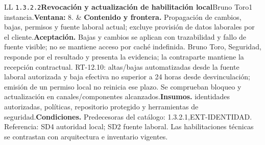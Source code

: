 \begin{longtable}{L{\tabcolsep\relax}L{\tabcolsep\relax}}
\texttt{1.\allowbreak{}3.\allowbreak{}2.\allowbreak{}2}\newline{}\textbf{Revocación y actualización de habilitación local}\newline{}Bruno Toro\newline{}1 instancia.\newline{}\textbf{Ventana:} 8. & \textbf{Contenido y frontera.} Propagación de cambios, bajas, permisos y fuente laboral actual; excluye provisión de datos laborales por el cliente.\newline{}\textbf{Aceptación.} Bajas y cambios se aplican con trazabilidad y fallo de fuente visible; no se mantiene acceso por caché indefinida. Bruno Toro, Seguridad, responde por el resultado y presenta la evidencia; la contraparte mantiene la recepción contractual. RT-12.10: altas/bajas automatizadas desde la fuente laboral autorizada y baja efectiva no superior a 24 horas desde desvinculación; emisión de un permiso local no reinicia ese plazo. Se comprueban bloqueo y actualización en canales/componentes alcanzados.\newline{}\textbf{Insumos.} identidades autorizadas, políticas, repositorio protegido y herramientas de seguridad.\newline{}\textbf{Condiciones.} Predecesoras del catálogo: 1.3.2.1,EXT-IDENTIDAD. Referencia: SD4 autoridad local; SD2 fuente laboral. Las habilitaciones técnicas se contrastan con arquitectura e inventario vigentes.\\\hline

\end{longtable}
